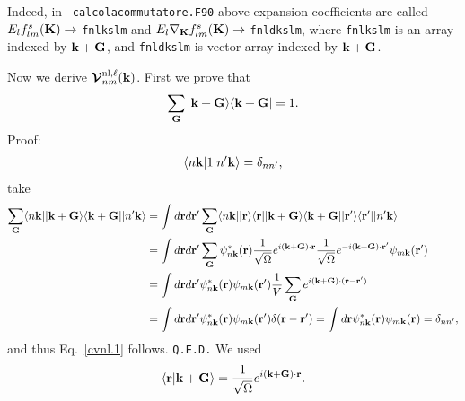 Indeed, in \depe~\verb=calcolacommutatore.F90= above expansion
coefficients are called\\
 $E_lf_{lm}^s (\mathbf{K})\to$ \verb=fnlkslm= and 
$E_l\nabla_{\mathbf{K}} f_{lm}^s(\mathbf{K})\to$ \verb=fnldkslm=, where 
 \verb=fnlkslm= is an array indexed by $\mathbf{k}+\mathbf{G}$, and 
 \verb=fnldkslm= is vector  array indexed by $\mathbf{k}+\mathbf{G}$.

Now we derive $\boldsymbol{\mathcal{\cal V}}^{\mathrm{nl},\ell}_{nm}(\mathbf{k})$. First we prove that
\begin{eqnarray}\label{cvnl.1}
\sum_{\mathbf{G}}
| \mathbf{k}+\mathbf{G} \rangle\langle \mathbf{k}+\mathbf{G} |
=1
.
\end{eqnarray}
\noindent Proof:
\begin{align}\label{cvnl.2}
\langle n\mathbf{k} |1| n'\mathbf{k} \rangle=\delta_{nn'}
,
\end{align}
take
\begin{align}\label{cvnl.3}
\sum_{\mathbf{G}} \langle n\mathbf{k} || \mathbf{k}+\mathbf{G} \rangle\langle \mathbf{k}+\mathbf{G} || n'\mathbf{k} \rangle
&=
\int d\mathbf{r} d\mathbf{r}' 
\sum_{\mathbf{G}} \langle n\mathbf{k} |
| \mathbf{r} \rangle\langle \mathbf{r} |
| \mathbf{k}+\mathbf{G} \rangle\langle \mathbf{k}+\mathbf{G} |
| \mathbf{r}' \rangle\langle \mathbf{r}' |
| n'\mathbf{k} \rangle
\nonumber\\
&=
\int d\mathbf{r} d\mathbf{r}' 
\sum_{\mathbf{G}} 
\psi^*_{n\mathbf{k}}(\mathbf{r}) 
\frac{1}{\sqrt{\Omega}}e^{i(\mathbf{k}+\mathbf{G})\cdot\mathbf{r}}
\frac{1}{\sqrt{\Omega}}e^{-i(\mathbf{k}+\mathbf{G})\cdot\mathbf{r}'}
\psi_{m\mathbf{k}}(\mathbf{r}') 
\nonumber\\
&=
\int d\mathbf{r} d\mathbf{r}' 
\psi^*_{n\mathbf{k}}(\mathbf{r}) 
\psi_{m\mathbf{k}}(\mathbf{r}') 
\frac{1}{V}
\sum_{\mathbf{G}} 
e^{i(\mathbf{k}+\mathbf{G})\cdot(\mathbf{r}-\mathbf{r}')}
\nonumber\\
&=
\int d\mathbf{r} d\mathbf{r}' 
\psi^*_{n\mathbf{k}}(\mathbf{r}) 
\psi_{m\mathbf{k}}(\mathbf{r}') 
\delta(\mathbf{r}-\mathbf{r}')
=
\int d\mathbf{r}
\psi^*_{n\mathbf{k}}(\mathbf{r}) 
\psi_{m\mathbf{k}}(\mathbf{r})=\delta_{nn'} ,
\end{align}
and thus Eq.~\eqref{cvnl.1} follows. \verb=Q.E.D.=
We used
\begin{align}\label{vnl.4}
\langle {\mathbf{r}} | {\mathbf{k}+\mathbf{G}} \rangle=\frac{1}{\sqrt{\Omega}}e^{i(\mathbf{k}+\mathbf{G})\cdot\mathbf{r}}
.
\end{align}

